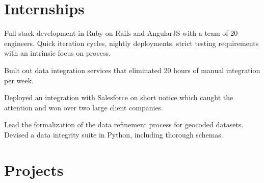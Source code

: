 \documentclass[letterpaper]{deedy-resume} %
\begin{document}
\begin{minipage}[t]{0.66\textwidth} %


\section{Internships}


\vspace{\topsep} %
\begin{tightitemize}
\item Full stack development in Ruby on Rails and AngularJS with a team of 20 engineers. Quick iteration cycles, nightly deployments, strict testing requirements with an intrinsic focus on process.
\item Built out data integration services that eliminated 20 hours of manual integration per week.
\item Deployed an integration with Salesforce on short notice which caught the attention and won over two large client companies.
\end{tightitemize}

\sectionspace %


\begin{tightitemize}
\item Lead the formalization of the data refinement process for geocoded datasets. Devised a data integrity suite in Python, including thorough schemas.
\end{tightitemize}

\sectionspace %



\section{Projects}


\end{minipage}
\end{document}
